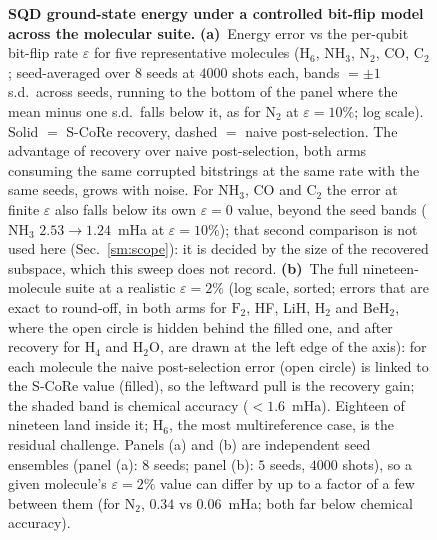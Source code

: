 \begin{figure}[tp]\centering
\caption{\textbf{SQD ground-state energy under a controlled bit-flip model across the molecular suite.}
\textbf{(a)}~Energy error vs the per-qubit bit-flip rate $\varepsilon$ for five representative molecules
($\mathrm{H_6}$, $\mathrm{NH_3}$, $\mathrm{N_2}$, CO, $\mathrm{C_2}$; seed-averaged over $8$ seeds at $4000$ shots each, bands $=\pm1$ s.d.\ across seeds, running to the bottom of the panel where the mean minus one s.d.\ falls below it, as for $\mathrm{N_2}$ at $\varepsilon=10\%$; log scale). Solid $=$ S-CoRe recovery, dashed $=$ naive
post-selection. The advantage of recovery over naive post-selection, both arms consuming the same corrupted
bitstrings at the same rate with the same seeds, grows with noise. For $\mathrm{NH_3}$, CO and
$\mathrm{C_2}$ the error at finite $\varepsilon$ also falls below its own $\varepsilon=0$ value, beyond
the seed bands ($\mathrm{NH_3}$ $2.53\to1.24$~mHa at $\varepsilon=10\%$);
that second comparison is not used here (Sec.~\ref{sm:scope}): it is decided by the size of
the recovered subspace, which this sweep does not record. \textbf{(b)}~The full nineteen-molecule suite at a realistic
$\varepsilon=2\%$ (log scale, sorted; errors that are exact to round-off, in both arms for
$\mathrm{F_2}$, HF, LiH, $\mathrm{H_2}$ and $\mathrm{BeH_2}$, where the open circle is hidden behind the
filled one, and after recovery for $\mathrm{H_4}$ and $\mathrm{H_2O}$, are drawn at the left edge of the
axis): for each molecule the naive post-selection error (open circle) is
linked to the S-CoRe value (filled), so the leftward pull is the recovery gain; the shaded band is
chemical accuracy ($<1.6$~mHa). Eighteen of nineteen land inside it; $\mathrm{H_6}$, the most
multireference case, is the residual challenge. Panels (a) and (b) are independent seed ensembles
(panel (a): $8$ seeds; panel (b): $5$ seeds, $4000$ shots), so a given molecule's $\varepsilon=2\%$ value
can differ by up to a factor of a few between them (for $\mathrm{N_2}$, $0.34$ vs $0.06$~mHa; both far below chemical accuracy).}\label{fig:noiserec}\end{figure}
